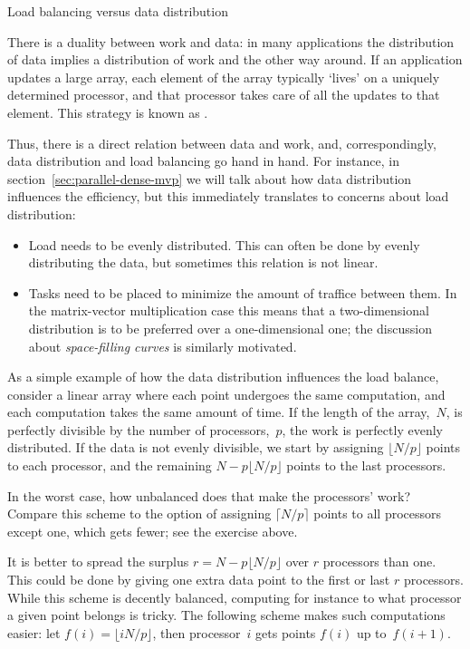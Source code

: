  {Load balancing versus data distribution}
\label{sec:load-vs-data}

There is a duality between work and data: in many applications
the distribution of data implies a distribution of work and
the other way around. If an application updates a large array,
each element of the array typically `lives' on a uniquely determined
processor, and that processor takes care of all the updates to that
element. This strategy is known as .

Thus, there is a direct relation between data and work,
and, correspondingly, data distribution and load balancing go hand in hand.
For instance, in section~\ref{sec:parallel-dense-mvp} we will talk about
how data distribution influences the efficiency, but this immediately translates
to concerns about load distribution:
\begin{itemize}
\item Load needs to be evenly distributed. This can often be done by
  evenly distributing the data, but sometimes this relation is not linear.
\item Tasks need to be placed to minimize the amount of traffice between them.
  In the matrix-vector multiplication case this means that a two-dimensional distribution
  is to be preferred over a one-dimensional one; the discussion about
  \emph{space-filling curves} is similarly motivated.
\end{itemize}

As a simple example of how the data distribution influences the load
balance, consider a linear array where each point undergoes the same
computation, and each computation takes the same amount of time.
If the length of the array,~$N$, is perfectly divisible by the number
of processors,~$p$, the work is perfectly evenly distributed.
If the data is not evenly divisible, we start by assigning $\lfloor N/p\rfloor$
points to each processor, and the remaining $N-p\lfloor N/p\rfloor$
points to the last processors.

\begin{exercise}
In the worst case, how unbalanced does that make the processors' work?
Compare this scheme to the option of assigning $\lceil N/p\rceil$
points to all processors except one, which gets fewer; see the exercise above.
\end{exercise}

It is better to spread the surplus $r=N-p\lfloor N/p\rfloor$
over $r$ processors than one. This could be done by giving one extra
data point to the first or last $r$ processors. While this scheme
is decently balanced, computing for instance to what processor
a given point belongs is tricky. The following scheme makes
such computations easier: let $f(i)=\lfloor iN/p\rfloor$, then processor~$i$
gets points $f(i)$ up to~$f(i+1)$.

